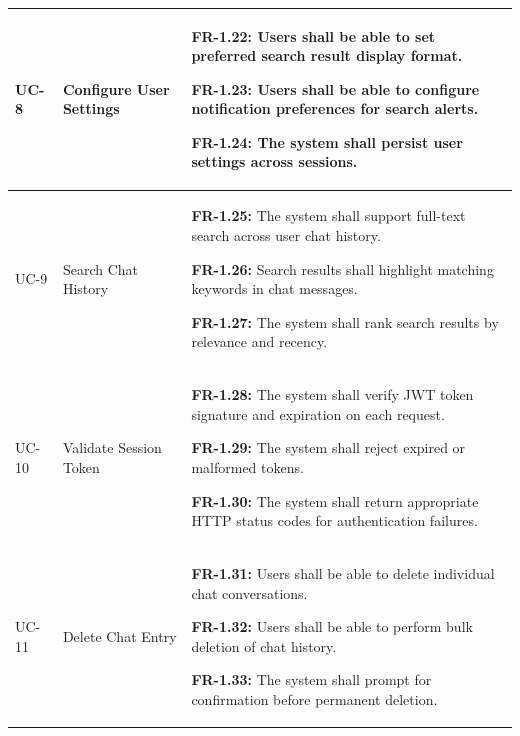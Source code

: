 \begin{longtable}{|>{\raggedright\arraybackslash}p{}|>{\raggedright\arraybackslash}p{}|>{\raggedright\arraybackslash}p{}|}
UC-8 & Configure User Settings &
\begin{frequirements}
\item \textbf{FR-1.22:} Users shall be able to set preferred search result display format.
\item \textbf{FR-1.23:} Users shall be able to configure notification preferences for search alerts.
\item \textbf{FR-1.24:} The system shall persist user settings across sessions.
\end{frequirements} \\
\hline

UC-9 & Search Chat History &
\begin{frequirements}
\item \textbf{FR-1.25:} The system shall support full-text search across user chat history.
\item \textbf{FR-1.26:} Search results shall highlight matching keywords in chat messages.
\item \textbf{FR-1.27:} The system shall rank search results by relevance and recency.
\end{frequirements} \\
\hline

UC-10 & Validate Session Token &
\begin{frequirements}
\item \textbf{FR-1.28:} The system shall verify JWT token signature and expiration on each request.
\item \textbf{FR-1.29:} The system shall reject expired or malformed tokens.
\item \textbf{FR-1.30:} The system shall return appropriate HTTP status codes for authentication failures.
\end{frequirements} \\
\hline

UC-11 & Delete Chat Entry &
\begin{frequirements}
\item \textbf{FR-1.31:} Users shall be able to delete individual chat conversations.
\item \textbf{FR-1.32:} Users shall be able to perform bulk deletion of chat history.
\item \textbf{FR-1.33:} The system shall prompt for confirmation before permanent deletion.
\end{frequirements} \\
\hline


\end{longtable}
